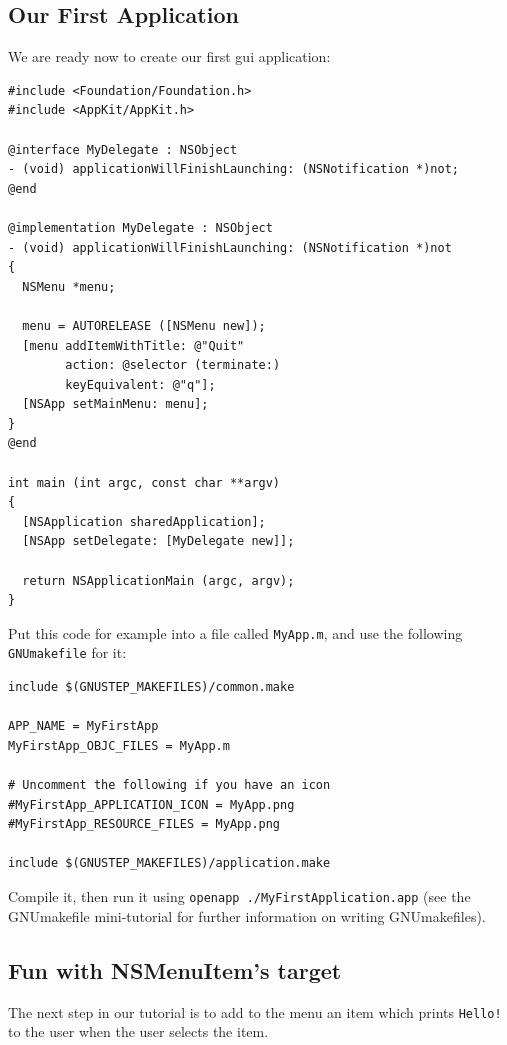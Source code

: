 \documentclass[a4paper]{article}
\begin{document}
\subsection{Our First Application}
We are ready now to create our first gui application: 
\begin{verbatim}
#include <Foundation/Foundation.h>
#include <AppKit/AppKit.h>

@interface MyDelegate : NSObject
- (void) applicationWillFinishLaunching: (NSNotification *)not;
@end

@implementation MyDelegate : NSObject 
- (void) applicationWillFinishLaunching: (NSNotification *)not
{
  NSMenu *menu;
  
  menu = AUTORELEASE ([NSMenu new]);
  [menu addItemWithTitle: @"Quit"  
        action: @selector (terminate:)  
        keyEquivalent: @"q"];
  [NSApp setMainMenu: menu];
}
@end

int main (int argc, const char **argv)
{ 
  [NSApplication sharedApplication];
  [NSApp setDelegate: [MyDelegate new]];

  return NSApplicationMain (argc, argv);
}
\end{verbatim}
Put this code for example into a file called \texttt{MyApp.m}, and use 
the following \texttt{GNUmakefile} for it: 
\begin{verbatim}
include $(GNUSTEP_MAKEFILES)/common.make

APP_NAME = MyFirstApp
MyFirstApp_OBJC_FILES = MyApp.m 

# Uncomment the following if you have an icon
#MyFirstApp_APPLICATION_ICON = MyApp.png
#MyFirstApp_RESOURCE_FILES = MyApp.png

include $(GNUSTEP_MAKEFILES)/application.make
\end{verbatim}
Compile it, then run it using \texttt{openapp
  ./MyFirstApplication.app} (see the GNUmakefile mini-tutorial for
further information on writing GNUmakefiles).

\subsection{Fun with NSMenuItem's target}
The next step in our tutorial is to add to the menu an item which
prints \texttt{Hello!} to the user when the user selects the item.
\end{document}
